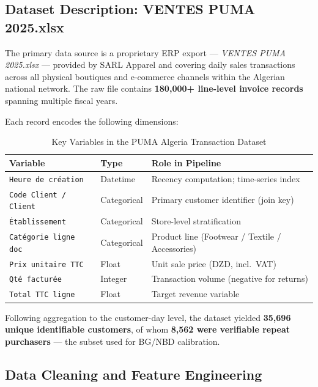 \subsection{Dataset Description: VENTES PUMA 2025.xlsx}

The primary data source is a proprietary ERP export — \textit{VENTES PUMA 2025.xlsx} — provided by SARL Apparel and covering daily sales transactions across all physical boutiques and e-commerce channels within the Algerian national network. The raw file contains \textbf{180,000+ line-level invoice records} spanning multiple fiscal years.

Each record encodes the following dimensions:

\begin{table}[H]
\centering
\caption{Key Variables in the PUMA Algeria Transaction Dataset}
\label{tab:dataset_vars}
\begin{tabular}{@{}lll@{}}
\toprule
\textbf{Variable} & \textbf{Type} & \textbf{Role in Pipeline} \\
\midrule
\texttt{Heure de création}   & Datetime  & Recency computation; time-series index \\
\texttt{Code Client / Client} & Categorical & Primary customer identifier (join key) \\
\texttt{Établissement}        & Categorical & Store-level stratification \\
\texttt{Catégorie ligne doc}  & Categorical & Product line (Footwear / Textile / Accessories) \\
\texttt{Prix unitaire TTC}    & Float       & Unit sale price (DZD, incl.\ VAT) \\
\texttt{Qté facturée}         & Integer     & Transaction volume (negative for returns) \\
\texttt{Total TTC ligne}      & Float       & Target revenue variable \\
\bottomrule
\end{tabular}
\end{table}

Following aggregation to the customer-day level, the dataset yielded \textbf{35,696 unique identifiable customers}, of whom \textbf{8,562 were verifiable repeat purchasers} — the subset used for BG/NBD calibration.

\subsection{Data Cleaning and Feature Engineering}

